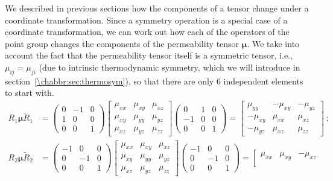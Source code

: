 We described in previous sections how the components of a tensor change under a coordinate transformation. Since a symmetry operation is a special case of a coordinate transformation, we can work out how each of the operators of the point group  changes the components of the permeability tensor $\bm{\mu}$.  We take into account the fact that the permeability tensor itself is a symmetric tensor, i.e., $\mu_{ij}=\mu_{ji}$ (due to intrinsic thermodynamic symmetry, which we will introduce in section~\ref{\chabbr:sec:thermosym}), so that there are only $6$ independent elements to start with.
{\small\begin{align*}
	R_1\bm{\mu}\tilde{R}_1 &= \begin{pmatrix}0&-1&0\\ 1&0&0\\ 0&0&1\end{pmatrix}
	\begin{bmatrix}\mu_{xx}&\mu_{xy}&\mu_{xz}\\ \mu_{xy}&\mu_{yy}&\mu_{yz}\\ \mu_{xz}&\mu_{yz}&\mu_{zz}\end{bmatrix}\begin{pmatrix}0&1&0\\ -1&0&0\\ 0&0&1\end{pmatrix} = 
	\left[\begin{array}{ccc} 
	 \mu_{yy} & -\mu_{xy} & -\mu_{yz} \\ 
	-\mu_{xy} &  \mu_{xx} & \mu_{xz} \\ 
	-\mu_{yz} &  \mu_{xz} & \mu_{zz}\end{array}\right]\ ;\\
	R_2\bm{\mu}\tilde{R}_2 &= \begin{pmatrix}-1&0&0\\ 0&-1&0\\ 0&0&1\end{pmatrix}
	\begin{bmatrix}\mu_{xx}&\mu_{xy}&\mu_{xz}\\ \mu_{xy}&\mu_{yy}&\mu_{yz}\\ \mu_{xz}&\mu_{yz}&\mu_{zz}\end{bmatrix}\begin{pmatrix}-1&0&0\\ 0&-1&0\\ 0&0&1\end{pmatrix} = 
	\left[\begin{array}{ccc} 
	 \mu_{xx} & \mu_{xy} & -\mu_{xz} \\ 

\end{array}
\end{align*}}

